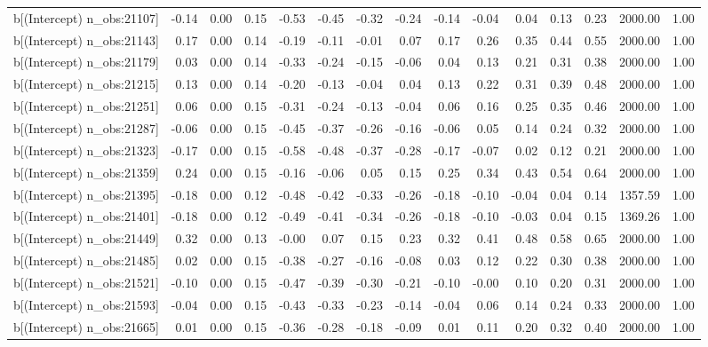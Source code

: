 \begin{table}[ht]
\begin{tabular}{rrrrrrrrrrrrrrr}
  b[(Intercept) n\_obs:21107] & -0.14 & 0.00 & 0.15 & -0.53 & -0.45 & -0.32 & -0.24 & -0.14 & -0.04 & 0.04 & 0.13 & 0.23 & 2000.00 & 1.00 \\ 
  b[(Intercept) n\_obs:21143] & 0.17 & 0.00 & 0.14 & -0.19 & -0.11 & -0.01 & 0.07 & 0.17 & 0.26 & 0.35 & 0.44 & 0.55 & 2000.00 & 1.00 \\ 
  b[(Intercept) n\_obs:21179] & 0.03 & 0.00 & 0.14 & -0.33 & -0.24 & -0.15 & -0.06 & 0.04 & 0.13 & 0.21 & 0.31 & 0.38 & 2000.00 & 1.00 \\ 
  b[(Intercept) n\_obs:21215] & 0.13 & 0.00 & 0.14 & -0.20 & -0.13 & -0.04 & 0.04 & 0.13 & 0.22 & 0.31 & 0.39 & 0.48 & 2000.00 & 1.00 \\ 
  b[(Intercept) n\_obs:21251] & 0.06 & 0.00 & 0.15 & -0.31 & -0.24 & -0.13 & -0.04 & 0.06 & 0.16 & 0.25 & 0.35 & 0.46 & 2000.00 & 1.00 \\ 
  b[(Intercept) n\_obs:21287] & -0.06 & 0.00 & 0.15 & -0.45 & -0.37 & -0.26 & -0.16 & -0.06 & 0.05 & 0.14 & 0.24 & 0.32 & 2000.00 & 1.00 \\ 
  b[(Intercept) n\_obs:21323] & -0.17 & 0.00 & 0.15 & -0.58 & -0.48 & -0.37 & -0.28 & -0.17 & -0.07 & 0.02 & 0.12 & 0.21 & 2000.00 & 1.00 \\ 
  b[(Intercept) n\_obs:21359] & 0.24 & 0.00 & 0.15 & -0.16 & -0.06 & 0.05 & 0.15 & 0.25 & 0.34 & 0.43 & 0.54 & 0.64 & 2000.00 & 1.00 \\ 
  b[(Intercept) n\_obs:21395] & -0.18 & 0.00 & 0.12 & -0.48 & -0.42 & -0.33 & -0.26 & -0.18 & -0.10 & -0.04 & 0.04 & 0.14 & 1357.59 & 1.00 \\ 
  b[(Intercept) n\_obs:21401] & -0.18 & 0.00 & 0.12 & -0.49 & -0.41 & -0.34 & -0.26 & -0.18 & -0.10 & -0.03 & 0.04 & 0.15 & 1369.26 & 1.00 \\ 
  b[(Intercept) n\_obs:21449] & 0.32 & 0.00 & 0.13 & -0.00 & 0.07 & 0.15 & 0.23 & 0.32 & 0.41 & 0.48 & 0.58 & 0.65 & 2000.00 & 1.00 \\ 
  b[(Intercept) n\_obs:21485] & 0.02 & 0.00 & 0.15 & -0.38 & -0.27 & -0.16 & -0.08 & 0.03 & 0.12 & 0.22 & 0.30 & 0.38 & 2000.00 & 1.00 \\ 
  b[(Intercept) n\_obs:21521] & -0.10 & 0.00 & 0.15 & -0.47 & -0.39 & -0.30 & -0.21 & -0.10 & -0.00 & 0.10 & 0.20 & 0.31 & 2000.00 & 1.00 \\ 
  b[(Intercept) n\_obs:21593] & -0.04 & 0.00 & 0.15 & -0.43 & -0.33 & -0.23 & -0.14 & -0.04 & 0.06 & 0.14 & 0.24 & 0.33 & 2000.00 & 1.00 \\ 
  b[(Intercept) n\_obs:21665] & 0.01 & 0.00 & 0.15 & -0.36 & -0.28 & -0.18 & -0.09 & 0.01 & 0.11 & 0.20 & 0.32 & 0.40 & 2000.00 & 1.00 \\ 

\end{tabular}
\end{table}
